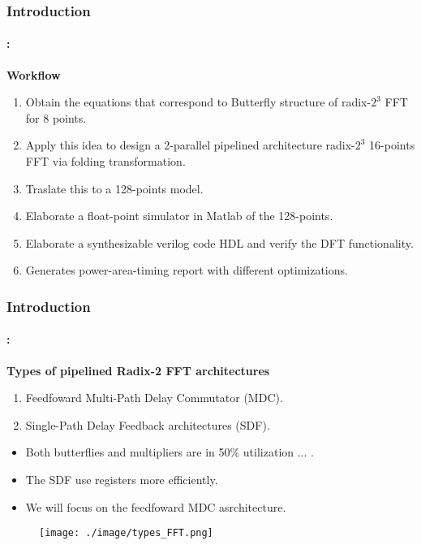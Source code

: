 \begin{frame}
	\frametitle{\textbf{Introduction}}
	\framesubtitle{\secname : \subsecname}
	\begin{block}{\centering \textbf{Workflow}}
		\begin{enumerate} \justifying\footnotesize
			\item Obtain the equations that correspond to Butterfly structure of radix-$2^3$ FFT for 8 points.
			\item Apply this idea to design a 2-parallel pipelined architecture radix-$2^3$ 16-points FFT via folding transformation.
			\item Traslate this to a 128-points model.
			\item Elaborate a float-point simulator in Matlab of the 128-points.
			\item Elaborate a synthesizable verilog code HDL and verify the DFT functionality.
			\item Generates power-area-timing report with different optimizations.
		\end{enumerate}
    \end{block}
\end{frame}


\begin{frame}
	\frametitle{\textbf{Introduction}}
    \framesubtitle{\secname : \subsecname}
	\begin{block}{\centering \textbf{Types of pipelined Radix-2 FFT architectures}}
		\begin{enumerate} \justifying\footnotesize
  			\item Feedfoward Multi-Path Delay Commutator (MDC).
  			\item Single-Path Delay Feedback architectures (SDF).
  		\end{enumerate}
		\begin{itemize} \justifying\footnotesize
  			\item Both butterflies and multipliers are in 50\% utilization ... .
  			\item The SDF use registers more efficiently.
  			\item We will focus on the feedfoward MDC asrchitecture.
  		\end{itemize}
    \end{block}

    \vspace{-0.2cm}
    \begin{figure}[!t] \centering
    \texttt{[image: ./image/types\_FFT.png]}
    \end{figure}
\end{frame}
